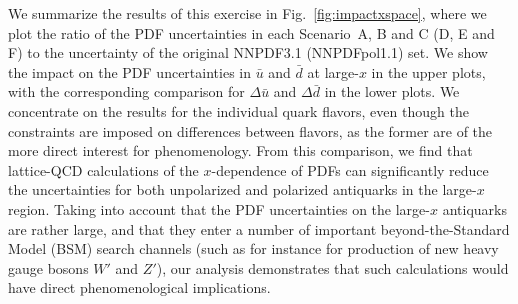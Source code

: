 We summarize the results of this exercise in Fig.~\ref{fig:impactxspace}, 
where we plot the ratio of the PDF uncertainties in each Scenario~A, B and C 
(D, E and F) to the uncertainty of the original
NNPDF3.1 (NNPDFpol1.1) set.
%
We show the impact on the PDF uncertainties
in $\bar{u}$ and $\bar{d}$ at large-$x$ in the upper
plots, with the corresponding comparison for $\Delta\bar{u}$
and $\Delta\bar{d}$ in the lower plots.
%
We concentrate on the results for the individual quark flavors, even though 
the constraints are imposed on differences between flavors, as the former are 
of the more direct interest for phenomenology. 
%
From this comparison, we find that lattice-QCD calculations of the 
$x$-dependence of PDFs can significantly reduce the uncertainties for both 
unpolarized and polarized antiquarks in the large-$x$ region.
%
Taking into account that the PDF uncertainties on the large-$x$
antiquarks are rather large, and that they
enter a number of important beyond-the-Standard Model (BSM) search channels
(such as for instance for production of new heavy gauge bosons $W'$ and $Z'$),
our analysis demonstrates that such calculations would have direct
phenomenological implications.
%

